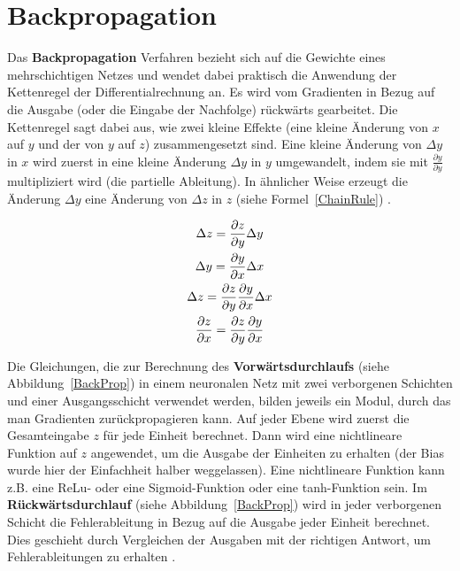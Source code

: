         \section{Backpropagation}
        Das \textbf{Backpropagation} Verfahren bezieht sich auf die Gewichte eines mehrschichtigen Netzes und wendet dabei praktisch die Anwendung der Kettenregel der  Differentialrechnung an. Es wird vom Gradienten in Bezug auf die Ausgabe (oder die Eingabe der Nachfolge) rückwärts gearbeitet. Die Kettenregel sagt dabei aus, wie zwei kleine Effekte (eine kleine Änderung von $x$ auf $y$ und der von $y$ auf $z$) zusammengesetzt sind. Eine kleine Änderung von $\Delta y$ in $x$ wird zuerst in eine kleine Änderung $\Delta y$ in $y$ umgewandelt, indem sie mit $\frac{\partial y}{\partial y}$  multipliziert wird (die partielle Ableitung). In ähnlicher Weise erzeugt die Änderung $\Delta y$ eine Änderung von $\Delta z$ in $z$ (siehe Formel~\ref{ChainRule}) \cite*{Lecun2015}.

        \begin{gather} \label{ChainRule}
            \Delta z =  \frac{\partial z}{\partial y} \Delta y \notag\\
            \Delta y = \frac{\partial y}{\partial x} \Delta x \notag\\
            \Delta z = \frac{\partial z}{\partial y}\frac{\partial y}{\partial x} \Delta x \notag\\
            \frac{\partial z}{\partial x} = \frac{\partial z}{\partial y} \frac{\partial y}{\partial x}
        \end{gather}




        Die Gleichungen, die zur Berechnung des \textbf{Vorwärtsdurchlaufs} (siehe Abbildung~\ref{BackProp}) in einem neuronalen Netz mit zwei verborgenen Schichten und einer Ausgangsschicht verwendet werden, bilden jeweils ein Modul, durch das man Gradienten zurückpropagieren kann. Auf jeder Ebene wird zuerst die Gesamteingabe $z$ für jede Einheit berechnet. Dann wird eine nichtlineare Funktion auf $z$ angewendet, um die Ausgabe der Einheiten zu erhalten (der Bias wurde hier der Einfachheit halber weggelassen). Eine nichtlineare Funktion kann z.B. eine ReLu- oder eine Sigmoid-Funktion oder eine tanh-Funktion sein. Im \textbf{Rückwärtsdurchlauf} (siehe Abbildung~\ref{BackProp}) wird in jeder verborgenen Schicht die Fehlerableitung in Bezug auf die Ausgabe jeder Einheit berechnet. Dies geschieht durch Vergleichen der Ausgaben mit der richtigen Antwort, um Fehlerableitungen zu erhalten \cite*{Lecun2015}.


